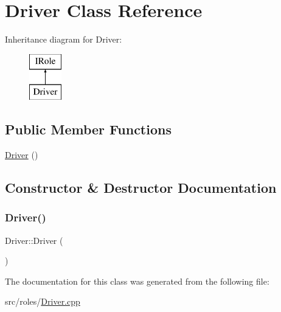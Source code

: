 \hypertarget{class_driver}{}\section{Driver Class Reference}
\label{class_driver}
Inheritance diagram for Driver\+:\begin{figure}[H]
\begin{center}
\leavevmode
\includegraphics[height=2.000000cm]{class_driver}
\end{center}
\end{figure}
\subsection*{Public Member Functions}
\begin{DoxyCompactItemize}
\item 
\mbox{\hyperlink{class_driver_af0658d103e3e810a8e9ef0a53bb2e261}{Driver}} ()
\end{DoxyCompactItemize}


\subsection{Constructor \& Destructor Documentation}
\mbox{\label{class_driver_af0658d103e3e810a8e9ef0a53bb2e261}} 
\subsubsection{\texorpdfstring{Driver()}{Driver()}}
{\footnotesize\ttfamily Driver\+::\+Driver (\begin{DoxyParamCaption}{ }\end{DoxyParamCaption})\hspace{0.3cm}{\ttfamily [inline]}}



The documentation for this class was generated from the following file\+:\begin{DoxyCompactItemize}
\item 
src/roles/\mbox{\hyperlink{_driver_8cpp}{Driver.\+cpp}}\end{DoxyCompactItemize}
